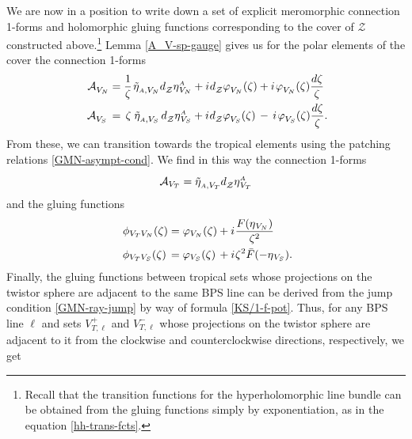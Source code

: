 \documentclass[11pt]{amsart}
\theoremstyle{remark}
\theoremstyle{remark}
\theoremstyle{definition}
\theoremstyle{definition}
\theoremstyle{definition}
\newcommand{\0}{{\scriptstyle 0'}} %
\newcommand{\1}{{\scriptstyle 1'}}
\newcommand{\A}{{\scriptscriptstyle A}} %
\newcommand{\pt}{\hspace{1pt}} %
\newcommand{\hp}{\hspace{0.5pt}} %
\begin{document}
We are now in a position to write down a set of explicit meromorphic connection 1-forms and holomorphic gluing functions corresponding to the cover of $\mathcal{Z}$ constructed above.\footnote{\pt Recall that the transition functions for the hyperholomorphic line bundle can be obtained from the gluing functions simply by exponentiation, as in the equation \eqref{hh-trans-fcts}.} Lemma \ref{A_V-sp-gauge} gives us for the polar elements of the cover the connection 1-forms
\begin{equation}
\begin{aligned}
\mathcal{A}^{\phantom{'}}_{V_N} & = \frac{1}{\zeta} \pt \tilde{\eta}^{\phantom{'}}_{\A,V_N}d^{\phantom{'}}_{\mathcal{Z}}\eta^{\A}_{\hp V_N} + i\hp d^{\phantom{'}}_{\mathcal{Z}}\varphi^{\phantom{'}}_{V_N}(\zeta) + i \pt \varphi^{\phantom{'}}_{V_N}(\zeta) \frac{d\zeta}{\zeta} \\
\mathcal{A}^{\phantom{'}}_{V_S} \, & = \, \zeta \pt \, \tilde{\eta}^{\phantom{'}}_{\A,V_S}\,d^{\phantom{'}}_{\mathcal{Z}}\eta^{\A}_{\hp V_S} + i\hp d^{\phantom{'}}_{\mathcal{Z}}\varphi^{\phantom{'}}_{V_S}(\zeta) \, - \, i \pt \varphi^{\phantom{'}}_{V_S}(\zeta) \frac{d\zeta}{\zeta} \rlap{.}
\end{aligned}
\end{equation}
From these, we can transition towards the tropical elements using the patching relations \eqref{GMN-asympt-cond}. We find in this way the connection 1-forms 
\begin{equation}
\mathcal{A}_{V_T} = \tilde{\eta}^{\phantom{'}}_{\A,V_T} d^{\phantom{'}}_{\mathcal{Z}}\eta^{\A}_{\hp V_T}
\end{equation}
and the gluing functions
\begin{equation}
\begin{aligned}
\phi_{V_TV_N}(\zeta) & = \varphi_{V_N}(\zeta) +  i \hp \frac{F(\eta_{\hp V_N})}{\zeta^2} \\
\phi_{V_TV_S}(\zeta) \hspace{1.5pt} & = \varphi_{V_S}(\zeta) \hspace{1.5pt} + i \hp \zeta^2 \bar{F}(-\eta_{\hp V_S}) \rlap{.}
\end{aligned}
\end{equation}
Finally, the gluing functions between tropical sets whose projections on the twistor sphere are adjacent to the same BPS line can be derived from the jump condition \eqref{GMN-ray-jump} by way of formula \eqref{KS/1-f-pot}. Thus, for any BPS line $\ell$ and sets $V_{T,\ell}^+ $ and $V_{T,\ell}^-$  whose projections on the twistor sphere are adjacent to it from the clockwise and counterclockwise directions, respectively, we get 
\end{document}
